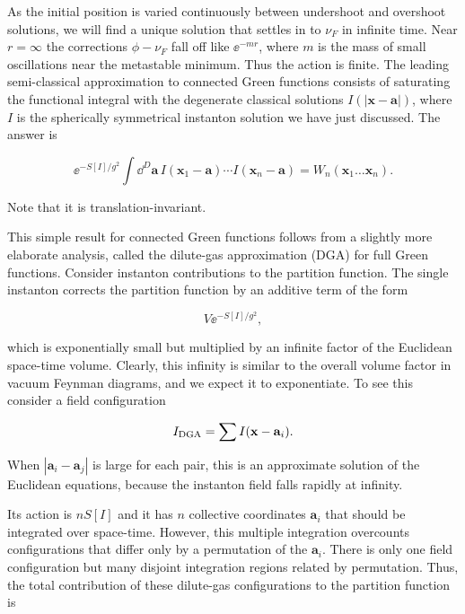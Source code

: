 As the initial position is varied continuously between undershoot and overshoot
solutions, we will find a unique solution that settles in to $\nu_F$ in infinite
time. Near $r=\infty$ the corrections $\phi-\nu_F$ fall off like
$\ee^{-mr}$, where $m$ is the mass of small oscillations near the metastable
minimum. Thus the action is finite. The leading semi-classical approximation to
connected Green functions consists of saturating the functional integral with
the degenerate classical solutions $I(|\mathbf x-\mathbf a|)$, where $I$ is the spherically
symmetrical instanton solution we have just discussed. The answer is

\[
  \ee^{-S[I]/g^2}\int\dd^D\mathbf a\,I(\mathbf x_1-\mathbf a)\cdots I(\mathbf x_n-\mathbf a)
  =W_n(\mathbf x_1\ldots \mathbf x_n).
\]

Note that it is translation-invariant.

This simple result for connected Green functions follows from a slightly more
elaborate analysis, called the dilute-gas approximation (DGA) for full Green
functions. Consider instanton contributions to the partition function. The
single instanton corrects the partition function by an additive term of the form

\[
  V\ee^{-S[I]/g^2},
\]

which is exponentially small but multiplied by an infinite factor of the
Euclidean space-time volume. Clearly, this infinity is similar to the overall
volume factor in vacuum Feynman diagrams, and we expect it to exponentiate. To
see this consider a field configuration

\[
  I_{\rm DGA}=\sum I(\mathbf x-\mathbf a_i).
\]

When $|\mathbf a_i-\mathbf a_j|$ is large for each pair, this is an approximate solution of the
Euclidean equations, because the instanton field falls rapidly at infinity.

Its action is $nS[I]$ and it has $n$ collective coordinates $\mathbf a_i$ that should be
integrated over space-time. However, this multiple integration overcounts
configurations that differ only by a permutation of the $\mathbf a_i$. There is only one
field configuration but many disjoint integration regions related by
permutation. Thus, the total contribution of these dilute-gas configurations to
the partition function is

